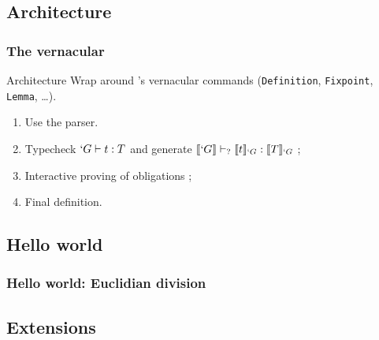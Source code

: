 \subsection{Architecture}
\begin{frame}[t]
  \frametitle{The \Program vernacular}
  
  \begin{block}{Architecture}
    Wrap around \Coq{}'s vernacular commands (\texttt{Definition},
    \texttt{Fixpoint}, \texttt{Lemma}, \ldots).
    
    \begin{enumerate}
    \item<2-> Use the \Coq{} parser.
    \item<3-> Typecheck $`G \vdash t : T$ and generate
      $\llbracket `G \rrbracket \vdash_{?} \llbracket t \rrbracket_{`G} : \llbracket T \rrbracket_{`G}$ ;
    \item<4-> Interactive proving of obligations ;
    \item<5-> Final definition.
    \end{enumerate}
  \end{block}
  
  
\end{frame}

\subsection{Hello world}
\begin{frame}
  \frametitle{Hello world: Euclidian division}

  \begin{center}
  \end{center}
\end{frame}

\subsection{Extensions}


